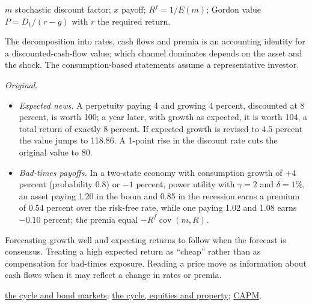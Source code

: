 \begin{qfresult}
 $m$ stochastic discount factor; $x$ payoff; $R^f=1/E(m)$; Gordon value $P=D_1/(r-g)$ with $r$ the required return.

 The decomposition into rates, cash flows and premia is an accounting identity for a discounted-cash-flow value; which channel dominates depends on the asset and the shock. The consumption-based statements assume a representative investor.

 \emph{Original.}
\begin{itemize}
\item \emph{Expected news.} A perpetuity paying 4 and growing 4 percent, discounted at 8 percent, is worth 100; a year later, with growth as expected, it is worth 104, a total return of exactly 8 percent. If expected growth is revised to 4.5 percent the value jumps to 118.86. A 1-point rise in the discount rate cuts the original value to 80.
\item \emph{Bad-times payoffs.} In a two-state economy with consumption growth of $+4$ percent (probability 0.8) or $-1$ percent, power utility with $\gamma=2$ and $\delta=1\%$, an asset paying 1.20 in the boom and 0.85 in the recession earns a premium of 0.54 percent over the risk-free rate, while one paying 1.02 and 1.08 earns $-0.10$ percent; the premia equal $-R^f\operatorname{cov}(m,R)$.
\end{itemize}

 Forecasting growth well and expecting returns to follow when the forecast is consensus. Treating a high expected return as ``cheap'' rather than as compensation for bad-times exposure. Reading a price move as information about cash flows when it may reflect a change in rates or premia.

 \hyperref[meth:cycle-rates-breakevens-spreads]{the cycle and bond markets}; \hyperref[meth:cycle-equities-property]{the cycle, equities and property}; \hyperref[mod:capm-sml]{CAPM}.

\end{qfresult}

